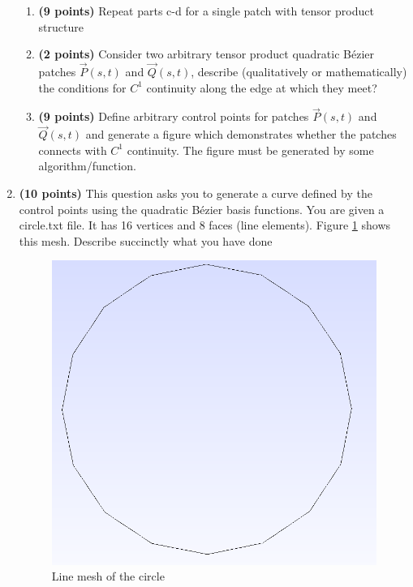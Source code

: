 \documentclass[a4paper, 11pt]{article}
\begin{document}
\begin{enumerate}
\begin{enumerate}[label=\alph*.]
    \item \textbf{(9 points)} Repeat parts c-d for a single patch with tensor product structure
    \item \textbf{(2 points)} Consider two arbitrary tensor product quadratic B\'{e}zier patches $\vec P(s,t)$ and $\vec Q(s,t)$, describe (qualitatively or mathematically) the conditions for $C^1$ continuity along the edge at which they meet?  
    \item \textbf{(9 points)} Define arbitrary control points for patches $\vec P(s,t)$ and $\vec Q(s,t)$ and generate a figure which demonstrates whether the patches connects with $C^1$ continuity. The figure must be generated by some algorithm/function.
\end{enumerate}

\item \textbf{(10 points)} This question asks you to generate a curve defined by the control points using the quadratic B\'{e}zier basis functions. You are given a circle.txt file. It has 16 vertices and 8 faces (line elements). Figure \ref{fig:lineMesh} shows this mesh. Describe succinctly what you have done

\begin{figure}
\includegraphics[scale=0.25]{resources/circleMesh.png} 
\centering
\caption{Line mesh of the circle}
\label{fig:lineMesh}
\end{figure}


\end{enumerate}
\end{document}
